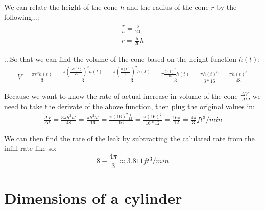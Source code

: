 \documentclass{article}
\begin{document}
We can relate the height of the cone $h$ and the radius of the cone $r$ by the following...:
\begin{eqnarray}
	\frac{r}{h} = \frac{5}{20} \\
	r = \frac{5}{20}h
\end{eqnarray}

...So that we can find the volume of the cone based on the height function $h(t)$:
\begin{eqnarray}
	V = \frac{\pi r^2 h(t)}{3}
	 = \frac{\pi (\frac{5h(t)}{20})^2 h(t)}{3}
	 = \frac{\pi (\frac{h(t)}{4})^2 h(t)}{3} 
	 = \frac{\pi \frac{h(t)^2}{16} h(t)}{3}
	 = \frac{\pi h(t)^3}{3 * 16}
	 = \frac{\pi h(t)^3}{48}
\end{eqnarray}

Because we want to know the rate of actual increase in volume of the cone $\frac{\Delta V}{\Delta t}$, we need to take the derivate of the above function, then plug the original values in:
\begin{eqnarray}
	\frac{\Delta V}{\Delta t} 
	= \frac{3 \pi h^2 h'}{48} 
	= \frac{\pi h^2 h'}{16}
	= \frac{\pi (16)^2 \frac{1}{12}}{16}
	= \frac{\pi (16)^2}{16 * 12}
	= \frac{16\pi}{12}
	= \frac{4\pi}{3} ft^3/min
\end{eqnarray}

We can then find the rate of the leak by subtracting the calulated rate from the infill rate like so:
\begin {equation}
	8 - \frac{4\pi}{3} \approx 3.811 ft^3/min
\end {equation}

\section{Dimensions of a cylinder}
\end{document}
